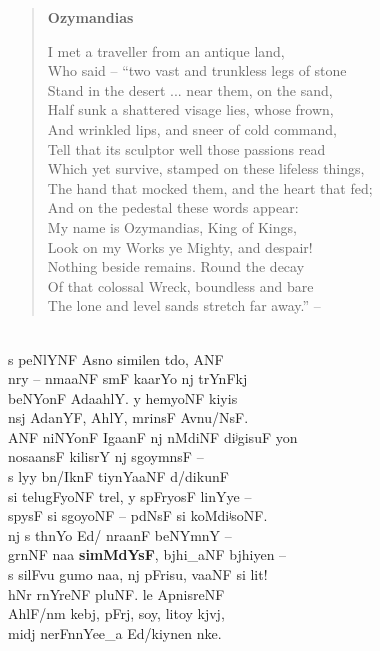 \blockcquote{shelley:ozymandias}{
	\textbf{Ozymandias}\medskip

	I met a traveller from an antique land, \\
	Who said -- ``two vast and trunkless legs of stone \\
	Stand in the desert ... near them, on the sand, \\
	Half sunk a shattered visage lies, whose frown, \\
	And wrinkled lips, and sneer of cold command, \\
	Tell that its sculptor well those passions read \\
	Which yet survive, stamped on these lifeless things, \\
	The hand that mocked them, and the heart that fed; \\
	And on the pedestal these words appear: \\
	My name is Ozymandias, King of Kings, \\
	Look on my Works ye Mighty, and despair! \\
	Nothing beside remains. Round the decay \\
	Of that colossal Wreck, boundless and bare \\
	The lone and level sands stretch far away.'' -- \medskip \\
}

\begin{flushleft}
 \\

s peNlYNF Asno similen tdo, ANF \\
nry – nmaaNF smF kaarYo nj trYnFkj \\
beNYonF AdaahlY. y hemyoNF kiyis \\
nsj AdanYF, AhlY, mrinsF Avnu/NsF. \\
ANF niNYonF IgaanF nj nMdiNF diʲgisuF yon \\
nosaansF kilisrY nj sgoymnsF – \\
s lyy bn/IknF tiynYaaNF d/dikunF \\
si telugFyoNF trel, y spFryosF linYye – \\
spysF si sgoyoNF – pdNsF si koMdiʲsoNF. \\
nj s thnYo Ed/ nraanF beNYmnY – \\
grnNF naa \textbf{simMdYsF}, bjhi\_aNF bjhiyen – \\
s silFvu gumo naa, nj pFrisu, vaaNF si lit! \\
hNr rnYreNF pluNF. le ApnisreNF \\
AhlF/nm kebj, pFrj, soy, litoy kjvj, \\
midj nerFnnYee\_a Ed/kiynen nke. \\
\end{flushleft}
\bigskip

